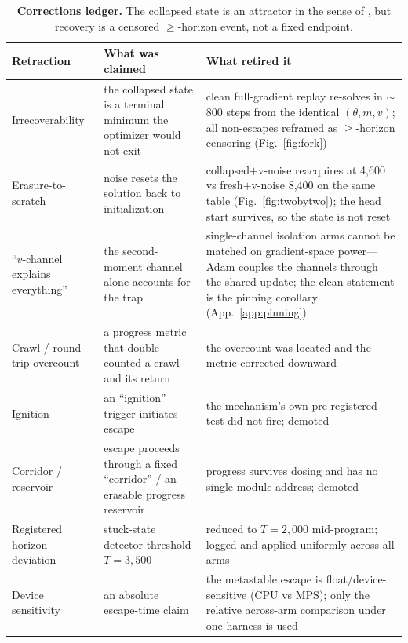 \documentclass[10pt]{article}
\begin{document}
\begin{table}[h]
\centering
\footnotesize
\setlength{\tabcolsep}{4pt}
\begin{tabular}{@{}p{2.9cm} p{4.0cm} p{6.0cm}@{}}
\toprule
Retraction & What was claimed & What retired it \\
\midrule
Irrecoverability & the collapsed state is a terminal minimum the optimizer would not exit & clean full-gradient replay re-solves in $\sim$800 steps from the identical $(\theta,m,v)$; all non-escapes reframed as $\ge$-horizon censoring (Fig.~\ref{fig:fork}) \\
Erasure-to-scratch & noise resets the solution back to initialization & collapsed$+$v-noise reacquires at 4{,}600 vs fresh$+$v-noise 8{,}400 on the same table (Fig.~\ref{fig:twobytwo}); the head start survives, so the state is not reset \\
``$v$-channel explains everything'' & the second-moment channel alone accounts for the trap & single-channel isolation arms cannot be matched on gradient-space power---Adam couples the channels through the shared update; the clean statement is the pinning corollary (App.~\ref{app:pinning}) \\
Crawl / round-trip overcount & a progress metric that double-counted a crawl and its return & the overcount was located and the metric corrected downward \\
Ignition & an ``ignition'' trigger initiates escape & the mechanism's own pre-registered test did not fire; demoted \\
Corridor / reservoir & escape proceeds through a fixed ``corridor'' / an erasable progress reservoir & progress survives dosing and has no single module address; demoted \\
Registered horizon deviation & stuck-state detector threshold $T=3{,}500$ & reduced to $T=2{,}000$ mid-program; logged and applied uniformly across all arms \\
Device sensitivity & an absolute escape-time claim & the metastable escape is float/device-sensitive (CPU vs MPS); only the relative across-arm comparison under one harness is used \\
\bottomrule
\end{tabular}
\caption{\textbf{Corrections ledger.} The collapsed state is an attractor in the
sense of \citet{stochcollapse}, but recovery is a censored $\ge$-horizon event,
not a fixed endpoint.}
\label{tab:corr}
\end{table}
\end{document}
